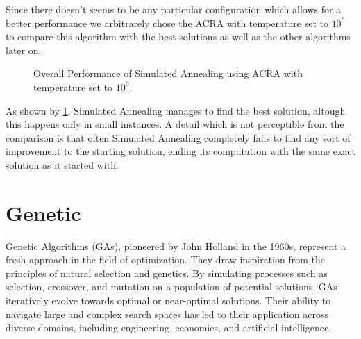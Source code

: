 Since there doesn't seems to be any particular configuration which allows for a better performance we arbitrarely chose the ACRA with temperature set to $10^6$ to compare this algorithm with the best solutions as well as the other algorithms later on.

\begin{figure}[htbp]
	\centering
	\caption{Overall Performance of Simulated Annealing using ACRA with temperature set to $10^6$.}
    \label{fig:annealingCost}
\end{figure}

As shown by \figurename{ \ref{fig:annealingCost}}, Simulated Annealing manages to find the best solution, altough this happens only in small instances.
A detail which is not perceptible from the comparison is that often Simulated Annealing completely fails to find any sort of improvement to the starting solution, ending its computation with the same exact solution as it started with.

\newpage

\section{Genetic}

Genetic Algorithms (GAs), pioneered by John Holland in the 1960s, represent a fresh approach in the field of optimization.
They draw inspiration from the principles of natural selection and genetics.
By simulating processes such as selection, crossover, and mutation on a population of potential solutions, GAs iteratively evolve towards optimal or near-optimal solutions.
Their ability to navigate large and complex search spaces has led to their application across diverse domains, including engineering, economics, and artificial intelligence.

